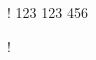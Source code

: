 \documentclass[12pt]{article}
\begin{document}
\iffalse
\ExplSyntaxOn
\makeatletter

 !
123
123%
%
456%

!

\makeatother
\ExplSyntaxOff
\end{document}
